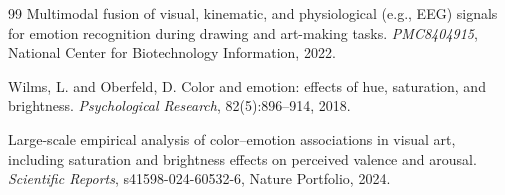 \documentclass[10pt,twocolumn,letterpaper]{article}
\begin{document}
\begin{thebibliography}{99}
Multimodal fusion of visual, kinematic, and physiological (e.g., EEG) signals for emotion recognition during drawing and art-making tasks.
\newblock \emph{PMC8404915}, National Center for Biotechnology Information, 2022.

Wilms, L. and Oberfeld, D.
\newblock Color and emotion: effects of hue, saturation, and brightness.
\newblock \emph{Psychological Research}, 82(5):896--914, 2018.

Large-scale empirical analysis of color--emotion associations in visual art, including saturation and brightness effects on perceived valence and arousal.
\newblock \emph{Scientific Reports}, s41598-024-60532-6, Nature Portfolio, 2024.

\end{thebibliography}
\end{document}
